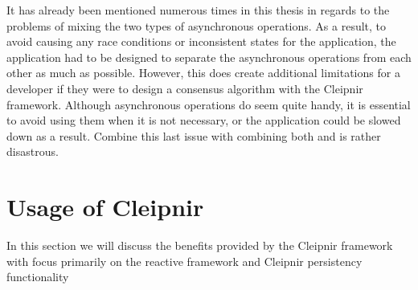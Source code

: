  It has already been mentioned numerous times in this thesis in regards to the problems of mixing the two types of asynchronous operations. As a result, to avoid causing any race conditions or inconsistent states for the application, the application had to be designed to separate the asynchronous operations from each other as much as possible. However, this does create additional limitations for a developer if they were to design a consensus algorithm with the Cleipnir framework. Although asynchronous operations do seem quite handy, it is essential to avoid using them when it is not necessary, or the application could be slowed down as a result. Combine this last issue with combining both  and  is rather disastrous. 
\section{Usage of Cleipnir}
\iffalse
-Really simple to use once gotten the used to it
-Cleipnir does provide as promised most of the necessary reactive operators that you would need. Thomas created the ones missing, meaning adding new ones should not be that big of an issue
-Extremely useful for handling the protocol messages in a step by step manner 
-Code is very reusable :)
-Very useful in general for handling event-driven programming
-Practically have to use the Cleipnir execution engine if you want to be absolutely certain the messages arrive in fcfs fashion(from our experience)
-Really not easy to stop an active stream, current workaround was limiting to say the least
-Forces programmer to either make a lot of additional \code{Source} objects or initialize the reactive streams as early as possible otherwise you most likely will lose messages/get stuck due to filtering out to many phase messages.

-unable to get the persistency to work for my implementaiton, unsure as to why...explain main problems
-General the way to assign Cleipnir properties to an object is intiuative and easy to use, kinda also needed if Cleipnir is to be used correctly
-Written enough test/tried practical examples to know that on a small basis the persistency works well enough
\fi
In this section we will discuss the benefits provided by the Cleipnir framework with focus primarily on the reactive framework and Cleipnir persistency functionality

